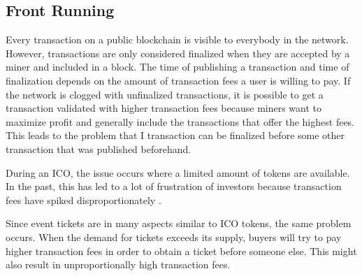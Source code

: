 
\subsection{Front Running}\label{subsection:front-running}

Every transaction on a public blockchain is visible to everybody in the network. However, transactions are only considered finalized when they are accepted by a miner and included in a block. The time of publishing a transaction and time of finalization depends on the amount of transaction fees a user is willing to pay. If the network is clogged with unfinalized transactions, it is possible to get a transaction validated with higher transaction fees because miners want to maximize profit and generally include the transactions that offer the highest fees. This leads to the problem that I transaction can be finalized before some other transaction that was published beforehand. 

During an ICO, the issue occurs where a limited amount of tokens are available. In the past, this has led to a lot of frustration of investors because transaction fees have spiked disproportionately \cite{bat-ico-tx-fees} \cite{ico-paradox}.

Since event tickets are in many aspects similar to ICO tokens, the same problem occurs. When the demand for tickets exceeds its supply, buyers will try to pay higher transaction fees in order to obtain a ticket before someone else. This might also result in unproportionally high transaction fees. 
